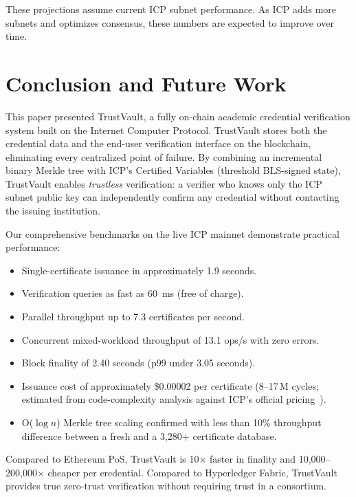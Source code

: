 \documentclass[journal]{IEEEtran}
\begin{document}
These projections assume current ICP subnet performance. As ICP adds more subnets and optimizes consensus, these numbers are expected to improve over time.

\section{Conclusion and Future Work}
\label{sec:conclusion}

This paper presented TrustVault, a fully on-chain academic credential verification system built on the Internet Computer Protocol. TrustVault stores both the credential data and the end-user verification interface on the blockchain, eliminating every centralized point of failure. By combining an incremental binary Merkle tree with ICP's Certified Variables (threshold BLS-signed state), TrustVault enables \emph{trustless} verification: a verifier who knows only the ICP subnet public key can independently confirm any credential without contacting the issuing institution.

Our comprehensive benchmarks on the live ICP mainnet demonstrate practical performance:
\begin{itemize}[leftmargin=*]
  \item Single-certificate issuance in approximately 1.9 seconds.
  \item Verification queries as fast as 60~ms (free of charge).
  \item Parallel throughput up to 7.3 certificates per second.
  \item Concurrent mixed-workload throughput of 13.1 ops/s with zero errors.
  \item Block finality of 2.40 seconds (p99 under 3.05 seconds).
  \item Issuance cost of approximately \$0.00002 per certificate (8--17\,M cycles; estimated from code-complexity analysis against ICP's official pricing~\cite{dfinity2025gascost}).
  \item O($\log n$) Merkle tree scaling confirmed with less than 10\% throughput difference between a fresh and a 3,280+ certificate database.
\end{itemize}

Compared to Ethereum PoS, TrustVault is 10$\times$ faster in finality and 10{,}000--200{,}000$\times$ cheaper per credential. Compared to Hyperledger Fabric, TrustVault provides true zero-trust verification without requiring trust in a consortium.
\end{document}
